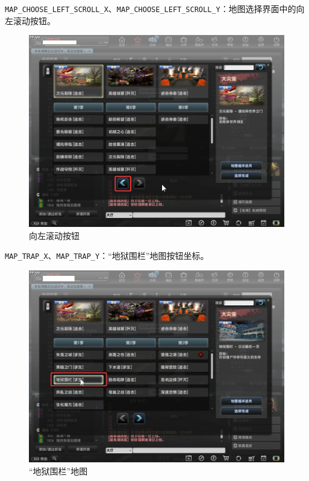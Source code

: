 \lstinline{MAP_CHOOSE_LEFT_SCROLL_X}、\lstinline{MAP_CHOOSE_LEFT_SCROLL_Y}：地图选择界面中的向左滚动按钮。

\begin{figure}[H]
    \Centering
    \includegraphics[width=\textwidth]{docs/assets/left_scroll.png}
    \caption{向左滚动按钮}
\end{figure}

\lstinline{MAP_TRAP_X}、\lstinline{MAP_TRAP_Y}：“地狱围栏”地图按钮坐标。

\begin{figure}[H]
    \Centering
    \includegraphics[width=\textwidth]{docs/assets/map_trap.png}
    \caption{“地狱围栏”地图}
\end{figure}

